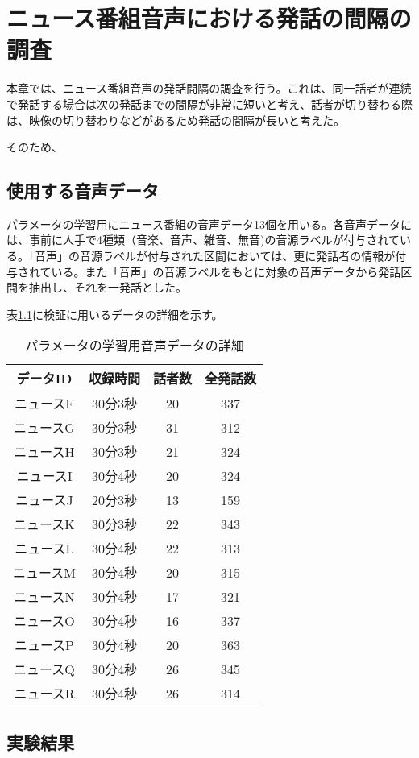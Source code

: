 \chapter{ニュース番組音声における発話の間隔の調査}
本章では、ニュース番組音声の発話間隔の調査を行う。これは、同一話者が連続で発話する場合は次の発話までの間隔が非常に短いと考え、話者が切り替わる際は、映像の切り替わりなどがあるため発話の間隔が長いと考えた。\par
そのため、

\section{使用する音声データ}
パラメータの学習用にニュース番組の音声データ13個を用いる。各音声データには、事前に人手で4種類（音楽、音声、雑音、無音)の音源ラベルが付与されている。「音声」の音源ラベルが付与された区間においては、更に発話者の情報が付与されている。また「音声」の音源ラベルをもとに対象の音声データから発話区間を抽出し、それを一発話とした。\par
表\ref{table:train_detail}に検証に用いるデータの詳細を示す。\vspace{0.2in}

\begin{table}[htb]
  \begin{center}
  \label{table:train_detail}
    \caption{パラメータの学習用音声データの詳細}
    \begin{tabular}{|c||c|c|c|} \hline
      データID & 収録時間 & 話者数 & 全発話数 \\ \hline
      ニュースF & 30分3秒 & 20 & 337 \\ \hline
      ニュースG & 30分3秒 & 31 & 312\\ \hline
      ニュースH & 30分3秒 & 21 & 324 \\ \hline
      ニュースI & 30分4秒 & 20 & 324\\ \hline
      ニュースJ & 20分3秒 & 13 & 159\\ \hline
      ニュースK & 30分3秒 & 22 & 343\\ \hline
      ニュースL & 30分4秒 & 22 & 313\\ \hline
      ニュースM & 30分4秒 & 20 & 315\\ \hline
      ニュースN & 30分4秒 & 17 & 321\\ \hline
      ニュースO & 30分4秒 & 16 & 337\\ \hline
      ニュースP & 30分4秒 & 20 & 363\\ \hline
      ニュースQ & 30分4秒 & 26 & 345\\ \hline
      ニュースR & 30分4秒 & 26 & 314\\ \hline
    \end{tabular}
  \end{center}
\end{table}
\section{実験結果}